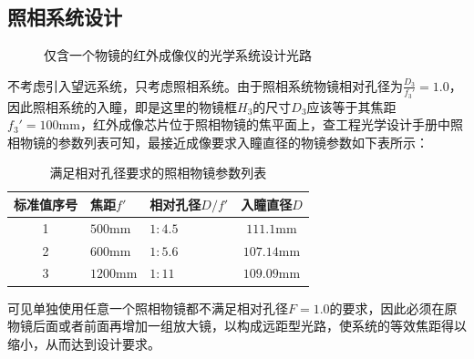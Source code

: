\documentclass[11pt]{article}
\begin{document}
\subsection{照相系统设计}
\begin{figure}[H]
  \centering
  \caption{仅含一个物镜的红外成像仪的光学系统设计光路}
  \label{fig:红外成像仪，一个物镜}
\end{figure}
不考虑引入望远系统，只考虑照相系统。由于照相系统物镜相对孔径为$\displaystyle\frac{D_3}{f_3'}=1.0$，因此照相系统的入瞳，即是这里的物镜框$H_3$的尺寸$D_3$应该等于其焦距$f_3'=100\unit{\mm}$，红外成像芯片位于照相物镜的焦平面上，查工程光学设计手册\cite*{optical_design}中照相物镜的参数列表可知，最接近成像要求入瞳直径的物镜参数如下表所示：
\begin{table}[H]
  \renewcommand{\arraystretch}{1.5}
  \centering
  \caption{满足相对孔径要求的照相物镜参数列表}
  \label{table:照相物镜参数列表}
  \begin{tabularx}{\textwidth}{|c|>{\centering}X|>{\centering}X|c|}
    \hline
    标准值序号 & 焦距$f'$           & 相对孔径$D/f'$ & 入瞳直径$D$            \\\hline
    1     & $500\unit{\mm}$  & $1:4.5  $  & $111.1\unit{\mm}$  \\\hline
    2     & $600\unit{\mm}$  & $1:5.6  $  & $107.14\unit{\mm}$ \\\hline
    3     & $1200\unit{\mm}$ & $1:11  $   & $109.09\unit{\mm}$ \\\hline
  \end{tabularx}
\end{table}
\par
可见单独使用任意一个照相物镜都不满足相对孔径$F=1.0$的要求，因此必须在原物镜后面或者前面再增加一组放大镜，以构成远距型光路，使系统的等效焦距得以缩小，从而达到设计要求。
\end{document}
